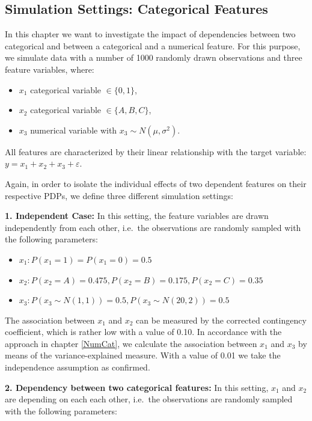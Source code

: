 \documentclass[
]{krantz}
\providecommand{\tightlist}{%
  \setlength{\itemsep}{0pt}\setlength{\parskip}{0pt}}
\begin{document}
\hypertarget{simulation-settings-categorical-features}{%
\subsection{Simulation Settings: Categorical Features}\label{simulation-settings-categorical-features}}

In this chapter we want to investigate the impact of dependencies between two categorical and between a categorical and a numerical feature. For this purpose, we simulate data with a number of 1000 randomly drawn observations and three feature variables, where:

\begin{itemize}
\tightlist
\item
  \(x_1\) categorical variable \(\in \{0,1\}\),
\item
  \(x_2\) categorical variable \(\in \{A,B,C\}\),
\item
  \(x_3\) numerical variable with \(x_3 \sim N(\mu, \sigma^2)\).
\end{itemize}

All features are characterized by their linear relationship with the target variable: \(y=x_1+x_2+x_3+\varepsilon\).

Again, in order to isolate the individual effects of two dependent features on their respective PDPs, we define three different simulation settings:

\textbf{1. Independent Case:} In this setting, the feature variables are drawn independently from each other, i.e.~the observations are randomly sampled with the following parameters:

\begin{itemize}
\tightlist
\item
  \(x_1: P(x_1=1)=P(x_1=0)=0.5\)
\item
  \(x_2: P(x_2=A)=0.475, P(x_2=B)=0.175, P(x_2=C)=0.35\)
\item
  \(x_3: P(x_3 \sim N(1,1))=0.5, P(x_3 \sim N(20,2))=0.5\)
\end{itemize}

The association between \(x_1\) and \(x_2\) can be measured by the corrected contingency coefficient, which is rather low with a value of 0.10. In accordance with the approach in chapter \ref{NumCat}, we calculate the association between \(x_1\) and \(x_3\) by means of the variance-explained measure. With a value of 0.01 we take the independence assumption as confirmed.

\textbf{2. Dependency between two categorical features:} In this setting, \(x_1\) and \(x_2\) are depending on each each other, i.e.~the observations are randomly sampled with the following parameters:
\end{document}
